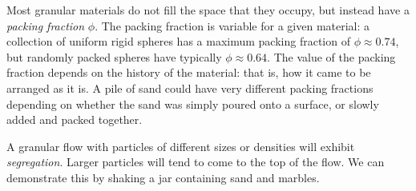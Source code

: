 Most granular materials do not fill the space that they occupy, but instead have a \textit{packing fraction} $\phi$. The packing fraction is variable for a given material: a collection of uniform rigid spheres has a maximum packing fraction of $\phi\approx0.74$, but randomly packed spheres have typically $\phi\approx0.64$. The value of the packing fraction depends on the history of the material: that is, how it came to be arranged as it is. A pile of sand could have very different packing fractions depending on whether the sand was simply poured onto a surface, or slowly added and packed together. 

A granular flow with particles of different sizes or densities will exhibit \textit{segregation}. Larger particles will tend to come to the top of the flow. We can demonstrate this by shaking a jar containing sand and marbles.




